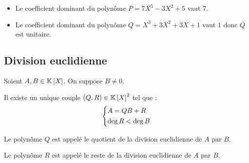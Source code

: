\begin{ex}
\begin{itemize}
\item Le coefficient dominant du polynôme \(P=7X^5-3X^2+5\) vaut \(7\). \\

\item Le coefficient dominant du polynôme \(Q=X^3+3X^2+3X+1\) vaut \(1\) donc \(Q\) est unitaire. \\
\end{itemize}
\end{ex}

\subsection{Division euclidienne}

\begin{defprop}
Soient \(A,B\in\poly\). On suppose \(B\not=0\).

Il existe un unique couple \(\paren{Q,R}\in\poly^2\) tel que : \[\begin{dcases}A=QB+R \\ \deg R<\deg B\end{dcases}\]

Le polynôme \(Q\) est appelé le quotient de la division euclidienne de \(A\) par \(B\).

Le polynôme \(R\) est appelé le reste de la division euclidienne de \(A\) par \(B\).
\end{defprop}

